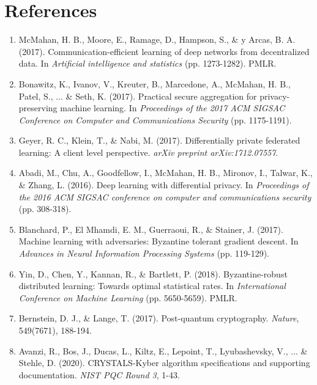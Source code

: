 \documentclass[12pt,a4paper]{article}
\begin{document}
\newpage
\section*{References}

\begin{enumerate}
    \item McMahan, H. B., Moore, E., Ramage, D., Hampson, S., \& y Arcas, B. A. (2017). Communication-efficient learning of deep networks from decentralized data. In \textit{Artificial intelligence and statistics} (pp. 1273-1282). PMLR.
    
    \item Bonawitz, K., Ivanov, V., Kreuter, B., Marcedone, A., McMahan, H. B., Patel, S., ... \& Seth, K. (2017). Practical secure aggregation for privacy-preserving machine learning. In \textit{Proceedings of the 2017 ACM SIGSAC Conference on Computer and Communications Security} (pp. 1175-1191).
    
    \item Geyer, R. C., Klein, T., \& Nabi, M. (2017). Differentially private federated learning: A client level perspective. \textit{arXiv preprint arXiv:1712.07557}.
    
    \item Abadi, M., Chu, A., Goodfellow, I., McMahan, H. B., Mironov, I., Talwar, K., \& Zhang, L. (2016). Deep learning with differential privacy. In \textit{Proceedings of the 2016 ACM SIGSAC conference on computer and communications security} (pp. 308-318).
    
    \item Blanchard, P., El Mhamdi, E. M., Guerraoui, R., \& Stainer, J. (2017). Machine learning with adversaries: Byzantine tolerant gradient descent. In \textit{Advances in Neural Information Processing Systems} (pp. 119-129).
    
    \item Yin, D., Chen, Y., Kannan, R., \& Bartlett, P. (2018). Byzantine-robust distributed learning: Towards optimal statistical rates. In \textit{International Conference on Machine Learning} (pp. 5650-5659). PMLR.
    
    \item Bernstein, D. J., \& Lange, T. (2017). Post-quantum cryptography. \textit{Nature}, 549(7671), 188-194.
    
    \item Avanzi, R., Bos, J., Ducas, L., Kiltz, E., Lepoint, T., Lyubashevsky, V., ... \& Stehle, D. (2020). CRYSTALS-Kyber algorithm specifications and supporting documentation. \textit{NIST PQC Round 3}, 1-43.
    

\end{enumerate}
\end{document}
